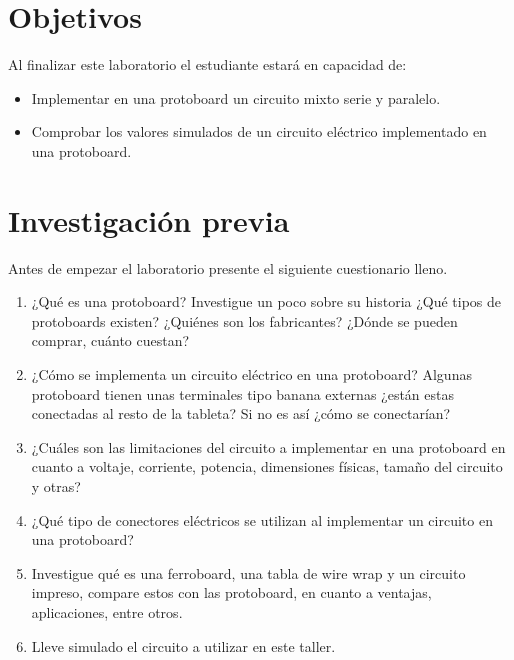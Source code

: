 \documentclass{report}
\newcommand{\obj}{Objetivos}
\newcommand{\inv}{Investigación previa}
\newcommand{\capacidad}{Al finalizar este laboratorio el estudiante estará en capacidad de:}
\newcommand{\antesde}{Antes de empezar el laboratorio presente el siguiente cuestionario lleno.}
\begin{document}
\section{\obj}
\capacidad
\begin{itemize}
\item Implementar en una protoboard un circuito mixto serie y paralelo.
\item Comprobar los valores simulados de un circuito eléctrico implementado en
una protoboard.
\end{itemize}
\section{\inv}
\antesde
\begin{enumerate}
\item ¿Qué es una protoboard? Investigue un poco sobre su historia ¿Qué tipos de
protoboards existen? ¿Quiénes son los fabricantes? ¿Dónde se pueden
comprar, cuánto cuestan?
\item ¿Cómo se implementa un circuito eléctrico en una protoboard? Algunas
protoboard tienen unas terminales tipo banana externas ¿están estas
conectadas al resto de la tableta? Si no es así ¿cómo se conectarían?
\item ¿Cuáles son las limitaciones del circuito a implementar en una protoboard en
cuanto a voltaje, corriente, potencia, dimensiones físicas, tamaño del circuito
y otras?
\item ¿Qué tipo de conectores eléctricos se utilizan al implementar un circuito en
una protoboard?
\item Investigue qué es una ferroboard, una tabla de wire wrap y un circuito
impreso, compare estos con las protoboard, en cuanto a ventajas,
aplicaciones, entre otros.
\item Lleve simulado el circuito a utilizar en este taller.
\end{enumerate}
\end{document}
